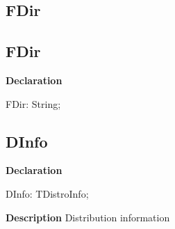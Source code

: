 \documentclass{report}
\newif\ifpdf
\begin{document}
\subsection*{\large{\textbf{FDir}}\normalsize\hspace{1ex}\hrulefill}
\else
\subsection*{FDir}
\fi
\label{imainunit-FDir}
\begin{list}{}{
\setlength{\itemindent}{0cm}
\setlength{\listparindent}{0cm}
\setlength{\leftmargin}{\evensidemargin}
\addtolength{\leftmargin}{\tmplength}
\settowidth{\labelsep}{X}
\addtolength{\leftmargin}{\labelsep}
\setlength{\labelwidth}{\tmplength}
}
\item[\textbf{Declaration}\hfill]
\ifpdf
\begin{flushleft}
\fi
\begin{ttfamily}
FDir:  String;\end{ttfamily}

\ifpdf
\end{flushleft}
\fi

\end{list}
\ifpdf
\subsection*{\large{\textbf{DInfo}}\normalsize\hspace{1ex}\hrulefill}
\else
\subsection*{DInfo}
\fi
\label{imainunit-DInfo}
\begin{list}{}{
\setlength{\itemindent}{0cm}
\setlength{\listparindent}{0cm}
\setlength{\leftmargin}{\evensidemargin}
\addtolength{\leftmargin}{\tmplength}
\settowidth{\labelsep}{X}
\addtolength{\leftmargin}{\labelsep}
\setlength{\labelwidth}{\tmplength}
}
\item[\textbf{Declaration}\hfill]
\ifpdf
\begin{flushleft}
\fi
\begin{ttfamily}
DInfo: TDistroInfo;\end{ttfamily}

\ifpdf
\end{flushleft}
\fi

\par
\item[\textbf{Description}]
Distribution information

\end{list}
\ifpdf
\end{document}
